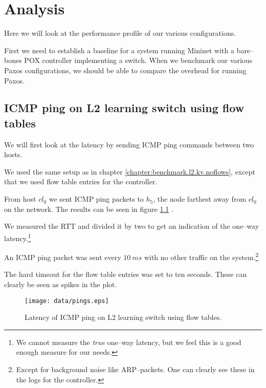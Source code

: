 \chapter{Analysis}

Here we will look at the performance profile of our various configurations.

First we need to establish a baseline for a system running Mininet with a
bare--bones POX controller implementing a switch.  When we benchmark our
various Paxos configurations, we should be able to compare the overhead for
running Paxos.


\section{ICMP ping on L2 learning switch using flow tables}

We will first look at the latency by sending ICMP ping commands between two
hosts.

We used the same setup as in chapter \ref{chapter:benchmark.l2.kv.noflows},
except that we used flow table entries for the controller.

From host $cl_0$ we sent ICMP ping packets to $h_5$, the node farthest away
from $cl_0$ on the network.  The results can be seen in figure
\ref{benchmark:l2.learning.switch.ping}
.

We measured the \ac{RTT} and divided it by two to get an indication of the
one--way latency.\footnote{We cannot measure the \textit{true} one--way
latency, but we feel this is a good enough measure for our needs.}

An ICMP ping packet was sent every $10~ms$ with no other traffic on the
system.\footnote{Except for background noise like ARP--packets.  One can
clearly see these in the logs for the controller.}

The hard timeout for the flow table entries was set to ten seconds.  These
can clearly be seen as spikes in the plot.

\begin{figure}
  \centering
  \texttt{[image: data/pings.eps]}
  \caption{Latency of ICMP ping on L2 learning switch using flow tables.}
  \label{benchmark:l2.learning.switch.ping}
\end{figure}

